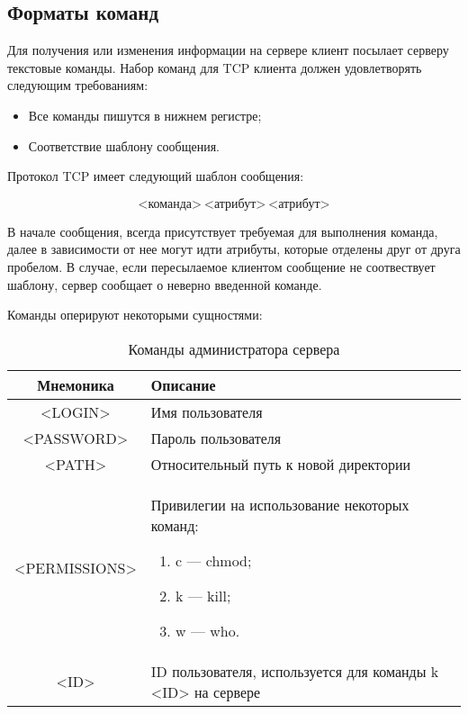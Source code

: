 \subsection{Форматы команд}

Для получения или изменения информации на сервере клиент посылает серверу текстовые команды. Набор команд для TCP клиента должен удовлетворять следующим требованиям:

\begin{itemize}
	\item Все команды пишутся в нижнем регистре;
	\item Соответствие шаблону сообщения.
\end{itemize}

Протокол TCP имеет следующий шаблон сообщения:

\[\text{<команда>} ~ \text{<атрибут>} ~ \text{<атрибут>}\]

В начале сообщения, всегда присутствует требуемая для выполнения команда, далее в зависимости от нее могут идти атрибуты, которые отделены друг от друга пробелом. В случае, если пересылаемое клиентом сообщение не соотвествует шаблону, сервер сообщает о неверно введенной команде.

Команды оперируют некоторыми сущностями:

\begin{table}[H]
	\centering
	\begin{tabular}{|c|M{12cm}|}
		\hline Мнемоника               & Описание	\\
		\hline <LOGIN>               & Имя пользователя	\\
		\hline <PASSWORD>               & Пароль пользователя	\\
		               & Относительный путь к новой директории	\\
		\hline <PERMISSIONS>               & Привилегии на использование некоторых команд:
		\begin{center}\begin{minipage}{.2\textwidth}
		\begin{enumerate}
	\item c --- chmod;
	\item k --- kill;
	\item w --- who.
\end{enumerate}\end{minipage}\end{center}	\\
		               & ID пользователя, используется для команды k <ID> на сервере	\\ \hline
	\end{tabular}
	\caption{Команды администратора сервера}
	\label{tab:tcp_after}
\end{table}


